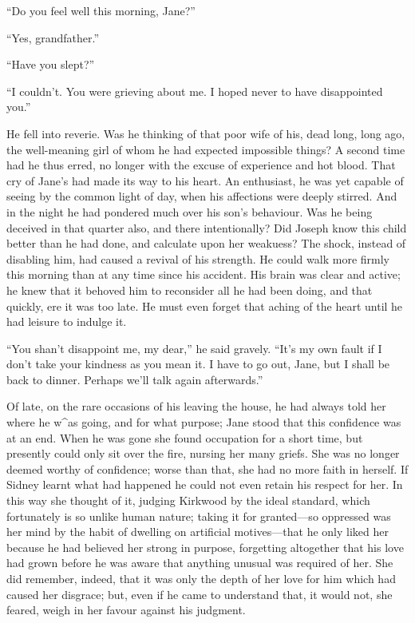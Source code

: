 ``Do you feel well this morning, Jane?''

``Yes, grandfather.''

``Have you slept?''

``I couldn't. You were grieving about me. I hoped never to have
disappointed you.''

He fell into reverie. Was he thinking of that poor wife of his, dead
long, long ago, the well-meaning girl of whom he had expected impossible
things? A second time had he thus erred, no longer with the excuse of
{\protect\hypertarget{139}{}{}}experience and hot blood. That cry of
Jane's had made its way to his heart. An enthusiast, he was yet capable
of seeing by the common light of day, when his affections were deeply
stirred. And in the night he had pondered much over his son's behaviour.
Was he being deceived in that quarter also, and there intentionally? Did
Joseph know this child better than he had done, and calculate upon her
weakuess? The shock, instead of disabling him, had caused a revival of
his strength. He could walk more firmly this morning than at any time
since his accident. His brain was clear and active; he knew that it
behoved him to reconsider all he had been doing, and that quickly, ere
it was too late. He must even forget that aching of the heart until he
had leisure to indulge it.

``You shan't disappoint me, my dear,'' he said gravely. ``It's my own
fault if I don't take your kindness as you mean it. I have to go out,
Jane, but I shall be back to dinner. Perhaps we'll talk again
afterwards.''

Of late, on the rare occasions of his leaving the house, he had always
told her where he w\^{}as going, and for what purpose; Jane
{\protect\hypertarget{140}{}{}}stood that this confidence was at an end.
When he was gone she found occupation for a short time, but presently
could only sit over the fire, nursing her many griefs. She was no longer
deemed worthy of confidence; worse than that, she had no more faith in
herself. If Sidney learnt what had happened he could not even retain his
respect for her. In this way she thought of it, judging Kirkwood by the
ideal standard, which fortunately is so unlike human nature; taking it
for granted---so oppressed was her mind by the habit of dwelling on
artificial motives---that he only liked her because he had believed her
strong in purpose, forgetting altogether that his love had grown before
he was aware that anything unusual was required of her. She did
remember, indeed, that it was only the depth of her love for him which
had caused her disgrace; but, even if he came to understand that, it
would not, she feared, weigh in her favour against his judgment.

